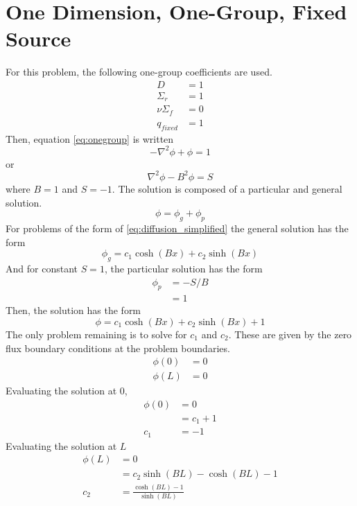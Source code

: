 \section{One Dimension, One-Group, Fixed Source}
  For this problem, the following one-group coefficients are used.
  \begin{align*}
    D &= 1\\
    \Sigma_r &= 1\\
    \nu \Sigma_f &= 0\\
    q_{fixed} &= 1
  \end{align*}
  Then, equation \eqref{eq:onegroup} is written
  \begin{equation}
    - \nabla^2 \phi + \phi = 1 
  \end{equation}
  or
  \begin{equation} \label{eq:diffusion_simplified}
    \nabla^2 \phi - B^2 \phi = S
  \end{equation}
  where $B = 1$ and $S=-1$.
  The solution is composed of a particular and general solution.
  \begin{equation}
    \phi = \phi_g + \phi_p 
  \end{equation}
  For problems of the form of \eqref{eq:diffusion_simplified} the general 
  solution has the form
  \begin{equation} \label{eq:general}
    \phi_g = c_1 \cosh(Bx) + c_2 \sinh(Bx)
  \end{equation}
  And for constant $S=1$, the particular solution has the form
  \begin{align} \label{eq:particular}
    \phi_p &= -S/B \\
    \nonumber &= 1
  \end{align}
  Then, the solution has the form
  \begin{equation} 
    \phi = c_1 \cosh(Bx) + c_2 \sinh(Bx) + 1
  \end{equation}
  The only problem remaining is to solve for $c_1$ and $c_2$. These are given
  by the zero flux boundary conditions at the problem boundaries.
  \begin{align}
    \phi(0) &= 0\\
    \phi(L) &= 0
  \end{align}
  Evaluating the solution at 0, 
  \begin{align}
    \phi(0) &= 0 \\
    &= c_1 + 1\\
    c_1 &= -1
  \end{align}
  Evaluating the solution at $L$
  \begin{align}
    \phi(L) &= 0\\
    &= c_2 \sinh(BL) - \cosh(BL)-1\\
    c_2 &= \frac{\cosh(BL)-1}{\sinh(BL)}
  \end{align}
